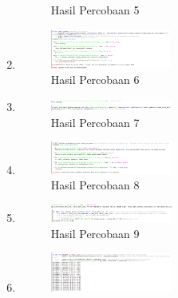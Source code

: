 \begin{enumerate}
\begin{figure}[H]
		\centering
		\caption{Hasil Percobaan 5}
    \end{figure}
    \item \hfill \break 
	\begin{figure}[H]
		\includegraphics[width=4cm]{figures/1174035/chapter2/6.png}
		\centering
		\caption{Hasil Percobaan 6}
    \end{figure}
    \item \hfill \break 
	\begin{figure}[H]
		\includegraphics[width=4cm]{figures/1174035/chapter2/7.png}
		\centering
		\caption{Hasil Percobaan 7}
    \end{figure}
    \item \hfill \break 
	\begin{figure}[H]
		\includegraphics[width=4cm]{figures/1174035/chapter2/8.png}
		\centering
		\caption{Hasil Percobaan 8}
    \end{figure}
    \item \hfill \break 
	\begin{figure}[H]
		\includegraphics[width=4cm]{figures/1174035/chapter2/9.png}
		\centering
		\caption{Hasil Percobaan 9}
    \end{figure}
    \item \hfill \break 
	\begin{figure}[H]
		\includegraphics[width=4cm]{figures/1174035/chapter2/10.png}

\end{figure}
\end{enumerate}
